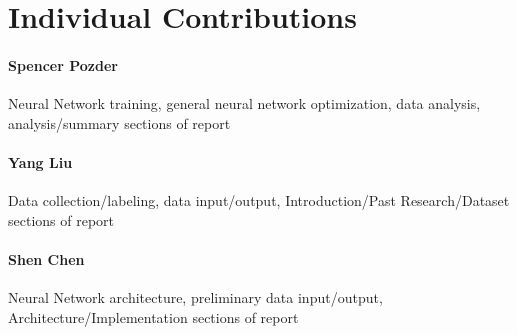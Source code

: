 \documentclass[runningheads]{llncs}
\begin{document}
\pagebreak
\section{Individual Contributions}

\paragraph{Spencer Pozder}
Neural Network training, general neural network optimization, data analysis, analysis/summary sections of report \\

\paragraph{Yang Liu}
Data collection/labeling, data input/output, Introduction/Past Research/Dataset sections of report \\

\paragraph{Shen Chen}
Neural Network architecture, preliminary data input/output, Architecture/Implementation sections of report
\end{document}
